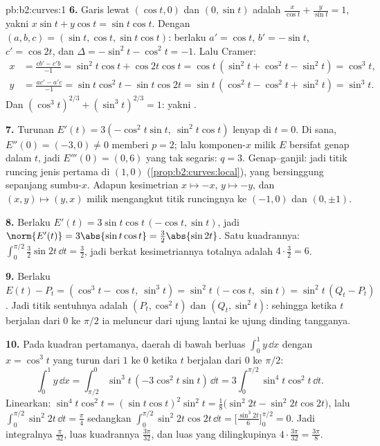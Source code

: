 \begin{solution}{pb:b2:curves:1}
\textbf{6.} Garis lewat $(\cos t, 0)$ dan $(0, \sin t)$
adalah $\frac x{\cos t} + \frac y{\sin t} = 1$, yakni $x\sin t +
y\cos t = \sin t\cos t$. Dengan $(a, b, c) = (\sin t, \cos t,
\sin t\cos t)$: berlaku $a' = \cos t$, $b' = -\sin t$, $c' = \cos
2t$, dan $\Delta = -\sin^2 t - \cos^2 t = -1$. Lalu Cramer:
\begin{align*}
x &= \frac{cb' - c'b}{-1} = \sin^2 t\cos t + \cos 2t\cos t
= \cos t\,(\sin^2 t + \cos^2 t - \sin^2 t) = \cos^3 t,\\
y &= \frac{ac' - a'c}{-1} = \sin t\cos^2 t - \sin t\cos 2t
= \sin t\,(\cos^2 t - \cos^2 t + \sin^2 t) = \sin^3 t .
\end{align*}
Dan $(\cos^3t)^{2/3} + (\sin^3t)^{2/3} = 1$: yakni .

\textbf{7.} Turunan $E'(t) = 3(-\cos^2 t\sin t,\ \sin^2 t\cos t)$
lenyap di $t = 0$. Di sana, $E''(0) = (-3, 0) \neq 0$ memberi
$p = 2$; lalu komponen-$x$ milik $E$ bersifat genap dalam $t$, jadi
$E'''(0) = (0, 6)$ yang tak segaris: $q = 3$. Genap--ganjil: jadi titik runcing
jenis pertama di $(1, 0)$
(\cref{prop:b2:curves:local}), yang bersinggung sepanjang
sumbu-$x$. Adapun kesimetrian $x \mapsto -x$, $y \mapsto -y$, dan $(x,
y) \mapsto (y, x)$ milik  mengangkut titik runcingnya ke $(-1,
0)$ dan $(0, \pm1)$.

\textbf{8.} Berlaku $E'(t) = 3\sin t\cos t\,(-\cos t, \sin t)$, jadi
$\norm{E'(t)} = 3\abs{\sin t\cos t} = \tfrac32\abs{\sin 2t}$.
Satu kuadrannya: $\int_0^{\pi/2}\tfrac32\sin 2t\,\dd t =
\tfrac32$, jadi berkat kesimetriannya  totalnya adalah $4 \cdot
\tfrac32 = 6$.

\textbf{9.} Berlaku $E(t) - P_t = (\cos^3 t - \cos t,\ \sin^3 t) =
\sin^2 t\,(-\cos t,\ \sin t) = \sin^2 t\,(Q_t - P_t)$. Jadi
titik sentuhnya adalah  $(P_t, \cos^2 t)$ dan
$(Q_t, \sin^2 t)$: sehingga ketika $t$ berjalan dari $0$ ke $\pi/2$ ia meluncur
dari ujung lantai ke ujung dinding tangganya.

\textbf{10.} Pada kuadran pertamanya, daerah di bawah
 berluas $\int_0^1 y\,\dd x$ dengan $x = \cos^3 t$
yang turun dari $1$ ke $0$ ketika $t$ berjalan dari $0$ ke $\pi/2$:
\[
\int_0^1 y\,\dd x
= \int_{\pi/2}^{0}\sin^3 t\,(-3\cos^2 t\sin t)\,\dd t
= 3\int_0^{\pi/2}\sin^4 t\cos^2 t\,\dd t .
\]
Linearkan: $\sin^4 t\cos^2 t = (\sin t\cos t)^2\sin^2 t =
\tfrac18\bigl(\sin^2 2t - \sin^2 2t\cos 2t\bigr)$, lalu
$\int_0^{\pi/2}\sin^2 2t\,\dd t = \tfrac\pi4$ sedangkan
$\int_0^{\pi/2}\sin^2 2t\cos 2t\,\dd t =
\bigl[\tfrac{\sin^3 2t}6\bigr]_0^{\pi/2} = 0$. Jadi
integralnya $\tfrac\pi{32}$, luas kuadrannya
$\tfrac{3\pi}{32}$, dan luas yang dilingkupinya $4 \cdot
\tfrac{3\pi}{32} = \tfrac{3\pi}8$.


\end{solution}
